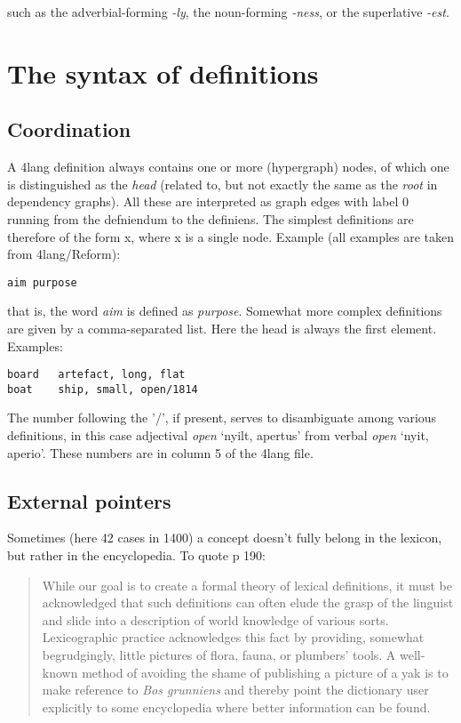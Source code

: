 \documentclass[11pt,bookmarks,bookmarksnumbered,naturalnames,plainpages=false,pdftex,colorlinks=true,urlcolor=blue,bookmarksdepth=subsection,plainpages=false]{paper}
\begin{document}
such as the adverbial-forming {\it -ly}, the noun-forming {\it -ness}, or the
superlative {\it -est}.






\section{The syntax of definitions}\label{8thcol}

\subsection{Coordination}\label{comma}

A 4lang definition always contains one or more (hypergraph) nodes, of which
one is distinguished as the {\it head} (related to, but not exactly the same
as the {\it root} in dependency graphs). All these are interpreted as graph
edges with label 0 running from the defniendum to the definiens.  The simplest
definitions are therefore of the form x, where x is a single node. Example
(all examples are taken from 4lang/Reform):

{\tt aim   purpose}

\noindent
that is, the word {\it aim} is defined as {\it purpose}. Somewhat more complex
definitions are given by a comma-separated list. Here the head is always the
first element. Examples:

\begin{verbatim}
board   artefact, long, flat    
boat    ship, small, open/1814  
\end{verbatim}

The number following the '/', if present, serves to disambiguate among various
definitions, in this case adjectival {\it open} `nyilt, apertus' from verbal
{\it open} `nyit, aperio'. These numbers are in column 5 of the 4lang file. 

\subsection{External pointers}\label{atsign}

Sometimes (here 42 cases in 1400) a concept doesn't fully belong in the
lexicon, but rather in the encyclopedia. To quote \cite{Kornai:2019} p 190:

\begin{quotation} 
While our goal is to create a formal theory of lexical definitions, it must be
acknowledged that such definitions can often elude the grasp of the linguist
and slide into a description of world knowledge of various sorts.
Lexicographic practice acknowledges this fact by providing, somewhat
begrudgingly, little pictures of flora, fauna, or plumbers’ tools. A
well-known method of avoiding the shame of publishing a picture of a yak is to
make reference to {\it Bos grunniens} and thereby point the dictionary user
explicitly to some encyclopedia where better information can be found.
\end{quotation}
\end{document}
